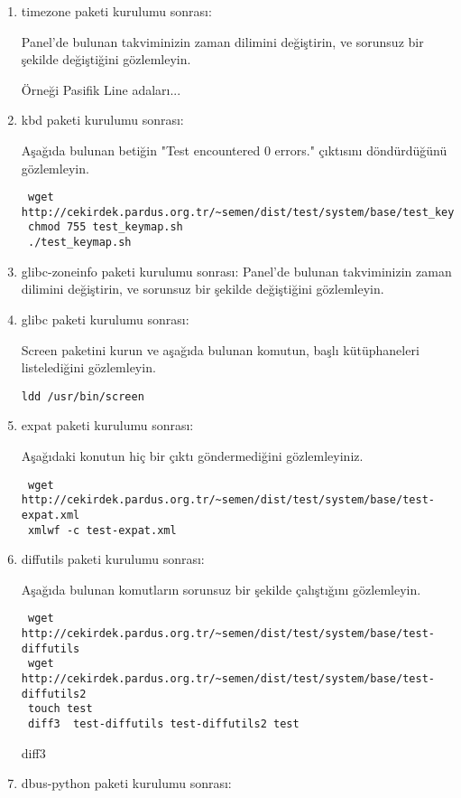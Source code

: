 \documentclass[a4paper,10pt]{article}
\begin{document}
\begin{enumerate}
\item timezone paketi kurulumu sonrası:

Panel'de bulunan takviminizin zaman dilimini değiştirin, ve sorunsuz bir şekilde değiştiğini gözlemleyin.

Örneği Pasifik Line adaları...

\item kbd paketi kurulumu sonrası:

Aşağıda bulunan betiğin "Test encountered 0 errors." çıktısını döndürdüğünü gözlemleyin.
\begin{verbatim}
 wget http://cekirdek.pardus.org.tr/~semen/dist/test/system/base/test_keymap.sh
 chmod 755 test_keymap.sh
 ./test_keymap.sh
\end{verbatim}



\item glibc-zoneinfo paketi kurulumu sonrası:
Panel'de bulunan takviminizin zaman dilimini değiştirin, ve sorunsuz bir şekilde değiştiğini gözlemleyin.

\item glibc paketi kurulumu sonrası:

Screen paketini kurun ve aşağıda bulunan komutun, başlı kütüphaneleri listelediğini gözlemleyin.
\begin{verbatim}
ldd /usr/bin/screen 
\end{verbatim}

\item expat paketi kurulumu sonrası:

Aşağıdaki konutun hiç bir çıktı göndermediğini gözlemleyiniz.
\begin{verbatim}
 wget http://cekirdek.pardus.org.tr/~semen/dist/test/system/base/test-expat.xml
 xmlwf -c test-expat.xml
\end{verbatim}

\item diffutils paketi kurulumu sonrası:

Aşağıda bulunan komutların sorunsuz bir şekilde çalıştığını gözlemleyin.
\begin{verbatim}
 wget http://cekirdek.pardus.org.tr/~semen/dist/test/system/base/test-diffutils
 wget http://cekirdek.pardus.org.tr/~semen/dist/test/system/base/test-diffutils2
 touch test
 diff3  test-diffutils test-diffutils2 test 
\end{verbatim}

diff3 
\item dbus-python paketi kurulumu sonrası:


\end{enumerate}
\end{document}
